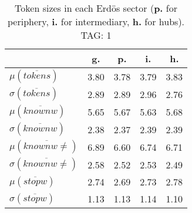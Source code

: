 \begin{table}[h!]
\begin{center}
\begin{tabular}{| l | c | c | c | c |}\hline
 & g. & p. & i. & h. \\\hline
$\mu(\overline{tokens})$ & 3.80  & 3.78  & 3.79  & 3.83 \\\hline
$\sigma(\overline{tokens})$ & 2.89  & 2.89  & 2.96  & 2.76 \\\hline
$\mu(\overline{knownw})$ & 5.65  & 5.67  & 5.63  & 5.68 \\\hline
$\sigma(\overline{knownw})$ & 2.38  & 2.37  & 2.39  & 2.39 \\\hline
$\mu(\overline{knownw \neq})$ & 6.89  & 6.60  & 6.74  & 6.71 \\\hline
$\sigma(\overline{knownw \neq})$ & 2.58  & 2.52  & 2.53  & 2.49 \\\hline
$\mu(\overline{stopw})$ & 2.74  & 2.69  & 2.73  & 2.78 \\\hline
$\sigma(\overline{stopw})$ & 1.13  & 1.13  & 1.14  & 1.10 \\\hline
\end{tabular}
\caption{Token sizes in each Erd\"os sector ({{\bf p.}} for periphery, {{\bf i.}} for intermediary, {{\bf h.}} for hubs). TAG: 1}
\end{center}
\end{table}